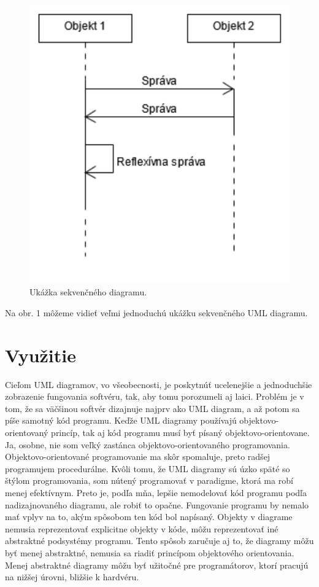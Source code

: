\documentclass[10pt,slovak,a4paper]{article}
\begin{document}
\begin{figure}[tbh]
\centering
\includegraphics[scale=0.7]{seq_diagram.pdf}
\caption{Ukážka sekvenčného diagramu.}
\end{figure}

\noindent Na obr. 1 môžeme vidieť veľmi jednoduchú ukážku sekvenčného UML diagramu.

\section{Využitie}
Cieľom UML diagramov, vo všeobecnosti, je poskytnúť ucelenejšie a jednoduchšie zobrazenie fungovania softvéru, tak, aby tomu porozumeli aj laici. 
Problém je v tom, že sa väčšinou softvér dizajnuje najprv ako UML diagram, a až potom sa píše samotný kód programu. Keďže UML diagramy používajú objektovo-orientovaný princíp, tak aj kód programu musí byť písaný objektovo-orientovane. \cite{eriksson98}
Ja, osobne, nie som veľký zastánca objektovo-orientovaného programovania. Objektovo-orientované programovanie ma skôr spomaluje, preto radšej programujem procedurálne. Kvôli tomu, že UML diagramy sú úzko späté so štýlom programovania, som nútený programovať v paradigme, ktorá 
ma robí menej efektívnym. Preto je, podľa mňa, lepšie nemodelovať kód programu podľa nadizajnovaného diagramu, ale robiť to opačne. Fungovanie programu by nemalo mať vplyv na to, akým spôsobom ten kód bol napísaný. Objekty v diagrame nemusia reprezentovať explicitne objekty v kóde, môžu reprezentovať 
iné abstraktné podsystémy programu. Tento spôsob zaručuje aj to, že diagramy môžu byť menej abstraktné, nemusia sa riadiť princípom objektového orientovania. Menej abstraktné diagramy môžu byť užitočné pre programátorov, ktorí pracujú na nižšej úrovni, bližšie k hardvéru. \newline 
\end{document}
